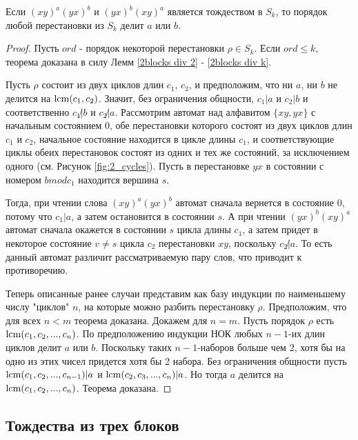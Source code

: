  \begin{theorem} \label{2blocks div ord}
 	Если $(xy)^a(yx)^b$ и $(yx)^b(xy)^a$ является тождеством в $S_k$, то порядок любой перестановки из $S_k$ делит $a$ или $b$.
 \end{theorem}
\begin{proof}
	Пусть $ord$ - порядок некоторой перестановки $\rho \in S_k$. Если $ord \le k$, теорема доказана в силу Лемм \ref{2blocks div 2} - \ref{2blocks div k}.
	
	Пусть $\rho$ состоит из двух циклов длин $c_1$, $c_2$, и предположим, что ни $a$, ни $b$ не делится на $\operatorname{lcm}(c_1, c_2)$. Значит, без ограничения общности, $c_1 | a$ и $c_2 | b$ и соответственно $c_1 \not | b$ и $c_2 \not | a$. 
	Рассмотрим автомат над алфавитом $\{xy, yx\}$ с начальным состоянием 0, обе перестановки которого состоят из двух циклов длин $c_1$ и $c_2$, начальное состояние находится в цикле длины $c_1$, и соответствующие циклы обеих перестановок состоят из одних и тех же состояний, за исключением одного (см. Рисунок \ref{fig:2_cycles}). Пусть в перестановке $yx$ в состоянии с номером $b mod c_1$ находится вершина $s$.
	
	Тогда, при чтении слова $(xy)^a(yx)^b$ автомат сначала вернется в состояние 0, потому что $c_1 | a$, а затем остановится в состоянии $s$. А при чтении $(yx)^b(xy)^a$ автомат сначала окажется в состоянии $s$ цикла длины $c_1$, а затем придет в некоторое состояние $v \ne s$ цикла $c_2$ перестановки $xy$, поскольку $c_2 \not | a$. То есть данный автомат различит рассматриваемую пару слов, что приводит к противоречию.
	
	Теперь описанные ранее случаи представим как базу индукции по наименьшему числу "циклов" $n$, на которые можно разбить перестановку $\rho$.
	Предположим, что для всех  $n < m$ теорема доказана. Докажем для $n=m$. Пусть порядок $\rho$ есть $\operatorname{lcm}(c_1, c_2, ..., c_n)$. По предположению индукции НОК любых $n-1$-их длин циклов делит $a$ или $b$. Поскольку таких $n-1$-наборов больше чем 2, хотя бы на одно из этих чисел придется хотя бы 2 набора. Без ограничения общности пусть $\operatorname{lcm}(c_1, c_2, ..., c_{n-1}) | a$ и $\operatorname{lcm}(c_2, c_3, ..., c_n) | a$. Но тогда $a$ делится на $\operatorname{lcm}(c_1, c_2, ..., c_n)$. Теорема доказана. 
\end{proof} 

\newpage
\subsection{Тождества из трех блоков}


